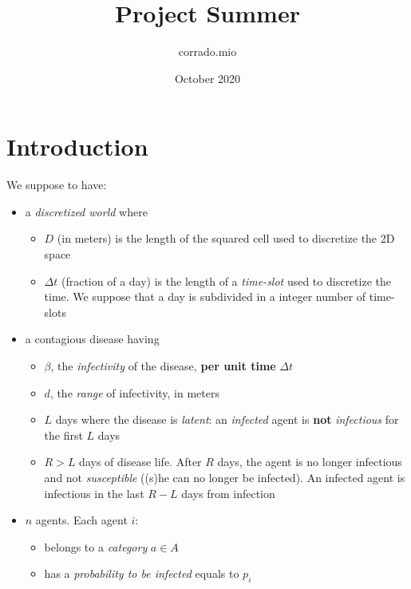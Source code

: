 \documentclass[12pt, a4paper]{article}
\title{Project Summer}
\author{corrado.mio }
\date{October 2020}
\begin{document}
\setlength{\parindent}{0em}
\maketitle

\section{Introduction}

We suppose to have:

\begin{itemize}
    \item a \textit{discretized world} where
        \begin{itemize}
            \item $D$ (in meters) is the length of the squared cell used to discretize the 2D space
            \item $\Delta{t}$ (fraction of a day) is the length of a \textit{time-slot} used to discretize the time. We suppose that a day is subdivided in a integer number of time-slots 
        \end{itemize}
    
    \item a contagious disease having
        \begin{itemize}
            \item $\beta$, the \textit{infectivity} of the disease, {\bf per unit time} $\Delta{t}$
            \item $d$, the \textit{range} of infectivity, in meters
            \item $L$ days where the disease is \textit{latent}: an  \textit{infected} agent is \textbf{not} \textit{infectious} for the first $L$ days
            \item $R > L$ days of disease life. After $R$ days, the agent is no longer infectious and not \textit{susceptible} ((s)he can no longer be infected). An infected agent is infectious in the last $R-L$ days from infection
        \end{itemize}
    
    \item $n$ agents. Each agent $i$:
        \begin{itemize}
            \item belongs to a \textit{category} $a \in A$
            \item has a \textit{probability to be infected} equals to $p_i$
        \end{itemize}
    

\end{itemize}
\end{document}
